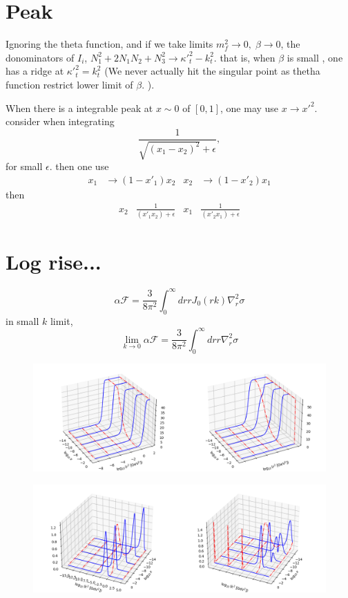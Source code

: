 \documentclass[12pt]{article}
\begin{document}
\section{Peak}
Ignoring the theta function, and if we take limits $m_f^2\rightarrow0,\;\beta\rightarrow0$, 
the donominators of $I_i$, $N_1^2+2N_1N_2+N_3^2\rightarrow {\kappa'}_t^2-k_t^2$.
that is, when $\beta$ is small , one has a ridge at ${\kappa'}_t^2=k_t^2$ (We never actually hit the singular point as thetha function restrict lower limit of $\beta$. ).

When there is a integrable peak at $x\sim0$ of $[0,1]$, one may use $x\rightarrow {x'}^2$. 
consider when integrating 
\begin{equation}
\frac{1}{\sqrt{(x_1-x_2)^2}+\epsilon},
\end{equation}
for small $\epsilon$.
 then one use
\begin{align}
x_1 &\rightarrow (1-{x'}_1) x_2& x_2 &\rightarrow (1-{x'}_2) x_1
\end{align}
then
\begin{align}
x_2&\frac{1}{ ({x'}_1 x_2)+\epsilon}& x_1&\frac{1}{({x'}_2 x_1)+\epsilon}
\end{align}



\section{Log rise...}
\begin{equation}
\alpha \mathcal{F} =\frac{3}{8\pi^2}\int^\infty_0dr r J_0(r k)\nabla^2_r \sigma
\end{equation}
in small $k$ limit,
\begin{equation}
\lim_{k\rightarrow0 } \alpha \mathcal{F} =\frac{3}{8\pi^2}\int^\infty_0dr r \nabla^2_r \sigma
\end{equation}

\begin{figure}
\includegraphics[width=\textwidth]{./dipole1.png}
\end{figure}
\begin{figure}
\includegraphics[width=\textwidth]{./gluon1.png}
\end{figure}
\end{document}
